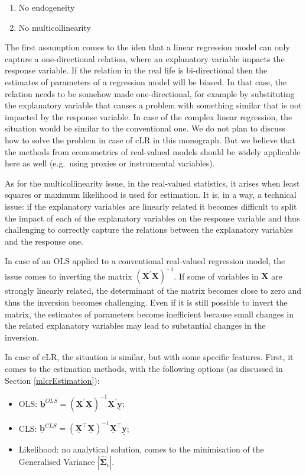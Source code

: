 \documentclass[
]{book}
\providecommand{\tightlist}{%
  \setlength{\itemsep}{0pt}\setlength{\parskip}{0pt}}
\begin{document}
\begin{enumerate}
\def\labelenumi{\arabic{enumi}.}
\tightlist
\item
  No endogeneity
\item
  No multicollinearity
\end{enumerate}

The first assumption comes to the idea that a linear regression model can only capture a one-directional relation, where an explanatory variable impacts the response variable. If the relation in the real life is bi-directional then the estimates of parameters of a regression model will be biased. In that case, the relation needs to be somehow made one-directional, for example by substituting the explanatory variable that causes a problem with something similar that is not impacted by the response variable. In case of the complex linear regression, the situation would be similar to the conventional one. We do not plan to discuss how to solve the problem in case of cLR in this monograph. But we believe that the methods from econometrics of real-valued models should be widely applicable here as well (e.g.~using proxies or instrumental variables).

As for the multicollinearity issue, in the real-valued statistics, it arises when least squares or maximum likelihood is used for estimation. It is, in a way, a technical issue: if the explanatory variables are linearly related it becomes difficult to split the impact of each of the explanatory variables on the response variable and thus challenging to correctly capture the relations between the explanatory variables and the response one.

In case of an OLS applied to a conventional real-valued regression model, the issue comes to inverting the matrix \(\left( {\mathbf{X}}^\prime {\mathbf{X}} \right)^{-1}\). If some of variables in \(\mathbf{X}\) are strongly linearly related, the determinant of the matrix becomes close to zero and thus the inversion becomes challenging. Even if it is still possible to invert the matrix, the estimates of parameters become inefficient because small changes in the related explanatory variables may lead to substantial changes in the inversion.

In case of cLR, the situation is similar, but with some specific features. First, it comes to the estimation methods, with the following options (as discussed in Section \ref{mlcrEstimation}):

\begin{itemize}
\tightlist
\item
  OLS: \(\underline{\boldsymbol{b}}^{OLS} = \left( \underline{\mathbf{X}}^\prime \underline{\mathbf{X}} \right)^{-1} \underline{\mathbf{X}}^\prime \underline{\mathbf{y}}\);
\item
  CLS: \(\underline{\boldsymbol{b}}^{CLS} = \left( \underline{\mathbf{X}}^\top \underline{\mathbf{X}}\right)^{-1} \underline{\mathbf{X}}^\top \underline{\mathbf{y}}\);
\item
  Likelihood: no analytical solution, comes to the minimisation of the Generalised Variance \(|\hat{\boldsymbol{\Sigma}}_\epsilon|\).
\end{itemize}
\end{document}

